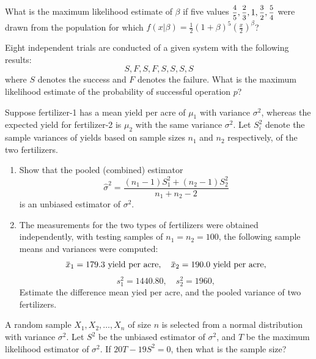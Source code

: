\begin{mdframed}
    \begin{Exercise}
        What is the maximum likelihood estimate of $\beta$ if five values 
        $\mfrac{4}{5}, \mfrac{2}{3}, 1, \mfrac{3}{2}, \mfrac{5}{4}$ were drawn from the 
        population for which
        $\displaystyle f(x|\beta) = \frac{1}{2}(1 + \beta)^5 \left(\frac{x}{2}\right)^\beta$?
    \end{Exercise}

    \begin{Exercise}
        Eight independent trials are conducted of a given system with the following results: 
        \[S, F, S, F, S, S, S, S\] 
    where $S$ denotes the success and $F$ denotes
    the failure. What is the maximum likelihood estimate of the probability of
    successful operation $p$?
    \end{Exercise}

    \begin{Exercise}
    Suppose fertilizer-1 has a mean yield per acre of $\mu_1$
    with variance $\sigma^2$, whereas the expected yield for fertilizer-2 is $\mu_2$ with the
    same variance $\sigma^2$. Let $S^2_i$ denote the sample variances of yields based on
    sample sizes $n_1$ and $n_2$ respectively, of the two fertilizers.
    \begin{enumerate}
        \item Show that the pooled (combined) estimator 
        \[
            \hat{\sigma}^2 = \frac{(n_1 - 1)S^2_1 + (n_2 - 1)S^2_2}{n_1 + n_2 - 2}
        \]
        is an unbiased estimator of $\sigma^2$.
        \item The measurements for the two types of fertilizers were obtained independently, with 
        testing samples of $n_1 = n_2 = 100$, the following sample means and variances were computed:
        \[
            \ols{x}_1 = 179.3 \text{ yield per acre}, \quad \ols{x}_2 = 190.0 \text{ yield per acre},
        \]
        \[
            s^2_1 = 1440.80, \quad s^2_2 = 1960,
        \]
        Estimate the difference mean yied per acre, and the pooled variance of two fertilizers.
    \end{enumerate}
    \end{Exercise}

    \vspace{0.752cm}
    \begin{Exercise}
        A random sample $X_1, X_2, \ldots, X_n$ of size $n$ is selected from a normal distribution 
        with variance $\sigma^2$. Let $S^2$ be the unbiased estimator of $\sigma^2$, and 
        $T$ be the maximum likelihood estimator of $\sigma^2$. If $20T - 19S^2 = 0$, then what is 
        the sample size?
    \end{Exercise}


\end{mdframed}
